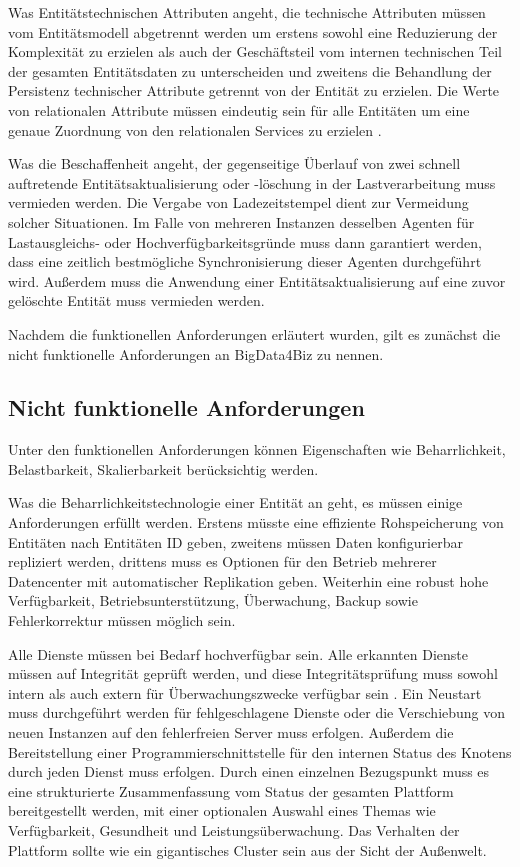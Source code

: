 Was Entitätstechnischen Attributen angeht, die technische Attributen müssen vom Entitätsmodell abgetrennt werden um erstens sowohl eine Reduzierung der Komplexität zu erzielen als auch der Geschäftsteil vom internen technischen Teil der gesamten Entitätsdaten zu unterscheiden und zweitens die Behandlung der Persistenz technischer Attribute getrennt von der Entität zu erzielen. 
Die Werte von relationalen Attribute müssen eindeutig sein für alle Entitäten um eine genaue Zuordnung von den relationalen Services zu erzielen \cite{DIB18}.

Was die Beschaffenheit angeht, der gegenseitige Überlauf von zwei schnell auftretende Entitätsaktualisierung oder -löschung in der Lastverarbeitung muss vermieden werden. Die Vergabe von Ladezeitstempel dient zur Vermeidung solcher Situationen. Im Falle von mehreren Instanzen desselben Agenten für Lastausgleichs- oder Hochverfügbarkeitsgründe muss dann garantiert werden, dass eine zeitlich bestmögliche Synchronisierung dieser Agenten durchgeführt wird. Außerdem muss die Anwendung einer Entitätsaktualisierung auf eine zuvor gelöschte Entität muss vermieden werden. 

Nachdem die funktionellen Anforderungen erläutert wurden, gilt es zunächst die nicht funktionelle Anforderungen an BigData4Biz zu nennen.

\subsection{Nicht funktionelle Anforderungen}
\label{subsec:NichtFunktAnforderungen}

Unter den funktionellen Anforderungen können Eigenschaften wie Beharrlichkeit, Belastbarkeit, Skalierbarkeit berücksichtig werden.

Was die Beharrlichkeitstechnologie einer Entität an geht, es müssen einige Anforderungen erfüllt werden. Erstens müsste eine effiziente Rohspeicherung von Entitäten nach Entitäten ID geben, zweitens müssen Daten konfigurierbar repliziert werden, drittens muss es Optionen für den Betrieb mehrerer Datencenter mit automatischer Replikation geben. Weiterhin eine robust hohe Verfügbarkeit, Betriebsunterstützung, Überwachung, Backup sowie Fehlerkorrektur müssen möglich sein.

Alle Dienste müssen bei Bedarf hochverfügbar sein. Alle erkannten Dienste müssen auf Integrität geprüft werden, und diese Integritätsprüfung muss sowohl intern als auch extern für Überwachungszwecke verfügbar sein \cite{DIB18}. Ein Neustart muss durchgeführt werden für fehlgeschlagene Dienste oder die Verschiebung von neuen Instanzen auf den fehlerfreien Server muss erfolgen. Außerdem die Bereitstellung einer Programmierschnittstelle für den internen Status des Knotens durch jeden Dienst muss erfolgen. Durch einen einzelnen Bezugspunkt muss es eine strukturierte Zusammenfassung vom Status der gesamten Plattform bereitgestellt werden, mit einer optionalen Auswahl eines Themas wie Verfügbarkeit, Gesundheit und Leistungsüberwachung. Das Verhalten der Plattform sollte wie ein gigantisches Cluster sein aus der Sicht der Außenwelt.

